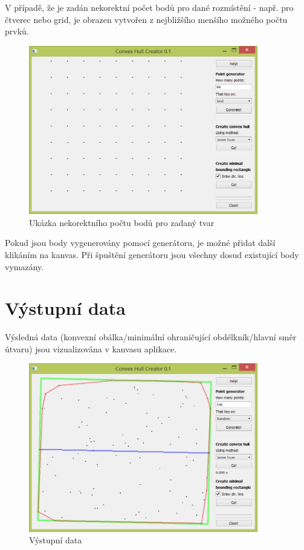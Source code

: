 \documentclass[a4paper, 12pt]{article}
\begin{document}
V případě, že je zadán nekorektní počet bodů pro dané rozmístění - např. pro čtverec nebo grid, je obrazen vytvořen z nejbližšího menšího možného počtu prvků.

\begin{figure}[h]
	\centering
	\includegraphics[width=10cm]{vstup.jpg}
	\caption{Ukázka nekorektního počtu bodů pro zadaný tvar}
\end{figure}
 
Pokud jsou body vygenerovány pomocí generátoru, je možné přidat další klikáním na kanvas.
Při špuštění generátoru jsou všechny dosud existující body vymazány.

\clearpage
\section{Výstupní data}
Výsledná data (konvexní obálka/minimální ohraničující obdélkník/hlavní směr útvaru) jsou vizualizována v kanvasu aplikace.   \\
\begin{figure}[h]
	\centering
	\includegraphics[width=10cm]{min_bound.jpg}
	\caption{Výstupní data}
\end{figure}
\end{document}
